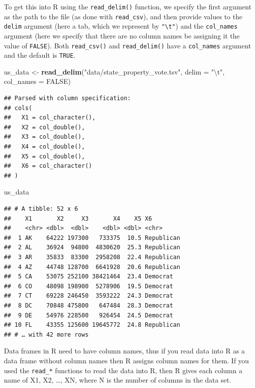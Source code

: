 \documentclass[
]{article}
\newenvironment{Shaded}{\begin{snugshade}}{\end{snugshade}}
\newcommand{\CharTok}[1]{\textcolor[rgb]{0.31,0.60,0.02}{#1}}
\newcommand{\DataTypeTok}[1]{\textcolor[rgb]{0.13,0.29,0.53}{#1}}
\newcommand{\KeywordTok}[1]{\textcolor[rgb]{0.13,0.29,0.53}{\textbf{#1}}}
\newcommand{\NormalTok}[1]{#1}
\newcommand{\OtherTok}[1]{\textcolor[rgb]{0.56,0.35,0.01}{#1}}
\newcommand{\StringTok}[1]{\textcolor[rgb]{0.31,0.60,0.02}{#1}}
\begin{document}
To get this into R using the \texttt{read\_delim()} function, we specify
the first argument as the path to the file (as done with
\texttt{read\_csv}), and then provide values to the \texttt{delim}
argument (here a tab, which we represent by
\texttt{"\textbackslash{}t"}) and the \texttt{col\_names} argument (here
we specify that there are no column names be assigning it the value of
\texttt{FALSE}). Both \texttt{read\_csv()} and \texttt{read\_delim()}
have a \texttt{col\_names} argument and the default is \texttt{TRUE}.

\begin{Shaded}
\begin{Highlighting}[]
\NormalTok{us\_data <{-}}\StringTok{ }\KeywordTok{read\_delim}\NormalTok{(}\StringTok{"data/state\_property\_vote.tsv"}\NormalTok{,  }\DataTypeTok{delim =} \StringTok{"}\CharTok{\textbackslash{}t}\StringTok{"}\NormalTok{, }\DataTypeTok{col\_names =} \OtherTok{FALSE}\NormalTok{)}
\end{Highlighting}
\end{Shaded}

\begin{verbatim}
## Parsed with column specification:
## cols(
##   X1 = col_character(),
##   X2 = col_double(),
##   X3 = col_double(),
##   X4 = col_double(),
##   X5 = col_double(),
##   X6 = col_character()
## )
\end{verbatim}

\begin{Shaded}
\begin{Highlighting}[]
\NormalTok{us\_data}
\end{Highlighting}
\end{Shaded}

\begin{verbatim}
## # A tibble: 52 x 6
##    X1       X2     X3       X4    X5 X6        
##    <chr> <dbl>  <dbl>    <dbl> <dbl> <chr>     
##  1 AK    64222 197300   733375  10.5 Republican
##  2 AL    36924  94800  4830620  25.3 Republican
##  3 AR    35833  83300  2958208  22.4 Republican
##  4 AZ    44748 128700  6641928  20.6 Republican
##  5 CA    53075 252100 38421464  23.4 Democrat  
##  6 CO    48098 198900  5278906  19.5 Democrat  
##  7 CT    69228 246450  3593222  24.3 Democrat  
##  8 DC    70848 475800   647484  28.3 Democrat  
##  9 DE    54976 228500   926454  24.5 Democrat  
## 10 FL    43355 125600 19645772  24.8 Republican
## # … with 42 more rows
\end{verbatim}

Data frames in R need to have column names, thus if you read data into R
as a data frame without column names then R assigns column names for
them. If you used the \texttt{read\_*} functions to read the data into
R, then R gives each column a name of X1, X2, \ldots, XN, where N is the
number of columns in the data set.
\end{document}
